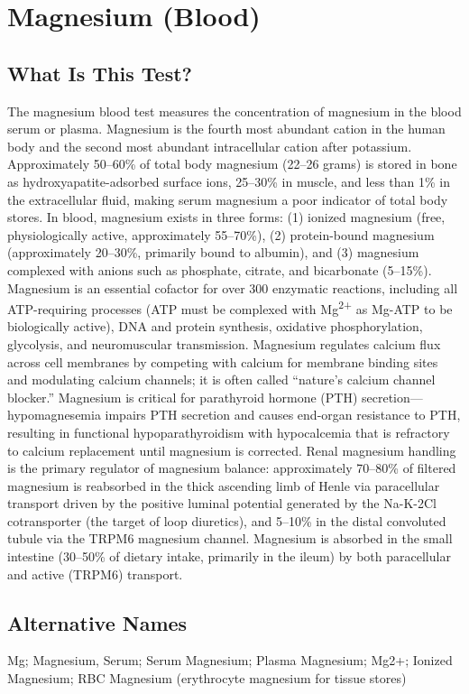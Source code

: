 \chapter{Magnesium (Blood)}

\section*{What Is This Test?}
The magnesium blood test measures the concentration of magnesium in the blood serum or plasma. Magnesium is the fourth most abundant cation in the human body and the second most abundant intracellular cation after potassium. Approximately 50--60\% of total body magnesium (22--26 grams) is stored in bone as hydroxyapatite-adsorbed surface ions, 25--30\% in muscle, and less than 1\% in the extracellular fluid, making serum magnesium a poor indicator of total body stores. In blood, magnesium exists in three forms: (1) ionized magnesium (free, physiologically active, approximately 55--70\%), (2) protein-bound magnesium (approximately 20--30\%, primarily bound to albumin), and (3) magnesium complexed with anions such as phosphate, citrate, and bicarbonate (5--15\%). Magnesium is an essential cofactor for over 300 enzymatic reactions, including all ATP-requiring processes (ATP must be complexed with Mg\textsuperscript{2+} as Mg-ATP to be biologically active), DNA and protein synthesis, oxidative phosphorylation, glycolysis, and neuromuscular transmission. Magnesium regulates calcium flux across cell membranes by competing with calcium for membrane binding sites and modulating calcium channels; it is often called ``nature's calcium channel blocker.'' Magnesium is critical for parathyroid hormone (PTH) secretion---hypomagnesemia impairs PTH secretion and causes end-organ resistance to PTH, resulting in functional hypoparathyroidism with hypocalcemia that is refractory to calcium replacement until magnesium is corrected. Renal magnesium handling is the primary regulator of magnesium balance: approximately 70--80\% of filtered magnesium is reabsorbed in the thick ascending limb of Henle via paracellular transport driven by the positive luminal potential generated by the Na-K-2Cl cotransporter (the target of loop diuretics), and 5--10\% in the distal convoluted tubule via the TRPM6 magnesium channel. Magnesium is absorbed in the small intestine (30--50\% of dietary intake, primarily in the ileum) by both paracellular and active (TRPM6) transport.

\section*{Alternative Names}
Mg; Magnesium, Serum; Serum Magnesium; Plasma Magnesium; Mg2+; Ionized Magnesium; RBC Magnesium (erythrocyte magnesium for tissue stores)

